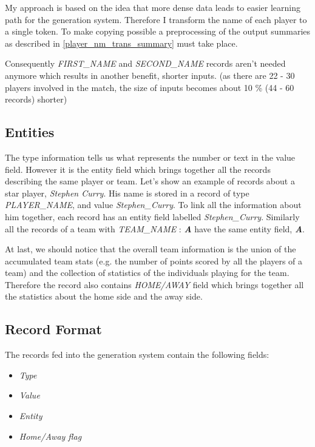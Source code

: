 My approach is based on the idea that more dense data leads to easier learning path for the generation system. Therefore I transform the name of each player to a single token. To make copying possible a preprocessing of the output summaries as described in \ref{player_nm_trans_summary} must take place. 

Consequently \emph{FIRST\_NAME} and \emph{SECOND\_NAME} records aren't needed anymore which results in another benefit, shorter inputs. (as there are 22 - 30 players involved in the match, the size of inputs becomes about 10 \% (44 - 60 records) shorter)

\subsection{Entities}

The type information tells us what represents the number or text in the value field. However it is the entity field which brings together all the records describing the same player or team. Let's show an example of records about a star player, \emph{Stephen Curry}. His name is stored in a record of type \emph{PLAYER\_NAME}, and value \emph{Stephen\_Curry}. To link all the information about him together, each record has an entity field labelled \emph{Stephen\_Curry}. Similarly all the records of a team with \emph{TEAM\_NAME} : \emph{\textbf{A}} have the same entity field, \emph{\textbf{A}}.

At last, we should notice that the overall team information is the union of the accumulated team stats (e.g. the number of points scored by all the players of a team) and the collection of statistics of the individuals playing for the team. Therefore the record also contains \emph{HOME/AWAY} field which brings together all the statistics about the home side and the away side.

\subsection{Record Format}

The records fed into the generation system contain the following fields:

\begin{itemize}
    \item \emph{Type}
    \item \emph{Value}
    \item \emph{Entity}
    \item \emph{Home/Away flag}
\end{itemize}

